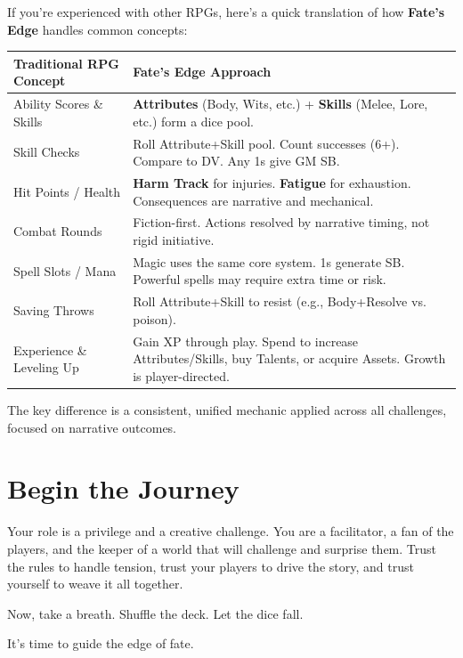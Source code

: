 \begin{tcolorbox}[enhanced, sharp corners, boxrule=1pt, colback=blue!5!white, colframe=blue!75!black, title={A Guide for Veterans: Fate's Edge in a Nutshell},breakable]
If you're experienced with other RPGs, here's a quick translation of how \textbf{Fate's Edge} handles common concepts:

\begin{center}
\begin{tabularx}{\linewidth}{|p{6cm}|p{6cm}|}
\hline
\textbf{Traditional RPG Concept} & \textbf{Fate's Edge Approach} \\
\hline
Ability Scores \& Skills & \textbf{Attributes} (Body, Wits, etc.) + \textbf{Skills} (Melee, Lore, etc.) form a dice pool. \\
\hline
Skill Checks & Roll Attribute+Skill pool. Count successes (6+). Compare to DV. Any 1s give GM SB. \\
\hline
Hit Points / Health & \textbf{Harm Track} for injuries. \textbf{Fatigue} for exhaustion. Consequences are narrative and mechanical. \\
\hline
Combat Rounds & Fiction-first. Actions resolved by narrative timing, not rigid initiative. \\
\hline
Spell Slots / Mana & Magic uses the same core system. 1s generate SB. Powerful spells may require extra time or risk. \\
\hline
Saving Throws & Roll Attribute+Skill to resist (e.g., Body+Resolve vs. poison). \\
\hline
Experience \& Leveling Up & Gain XP through play. Spend to increase Attributes/Skills, buy Talents, or acquire Assets. Growth is player-directed. \\
\hline
\end{tabularx}
\end{center}

The key difference is a consistent, unified mechanic applied across all challenges, focused on narrative outcomes.
\end{tcolorbox}

\section{Begin the Journey}
\label{sec:gm-begin}

Your role is a privilege and a creative challenge. You are a facilitator, a fan of the players, and the keeper of a world that will challenge and surprise them. Trust the rules to handle tension, trust your players to drive the story, and trust yourself to weave it all together.

Now, take a breath. Shuffle the deck. Let the dice fall.

It's time to guide the edge of fate.